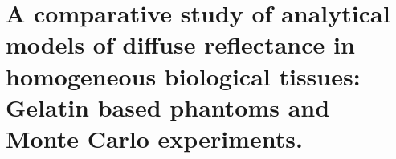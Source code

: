 





% 

\chapter[A comparative study of single-layer analytical models]{A comparative study of analytical models of diffuse reflectance in homogeneous biological tissues: Gelatin based phantoms and Monte Carlo experiments.}\label{chap:1layer}




